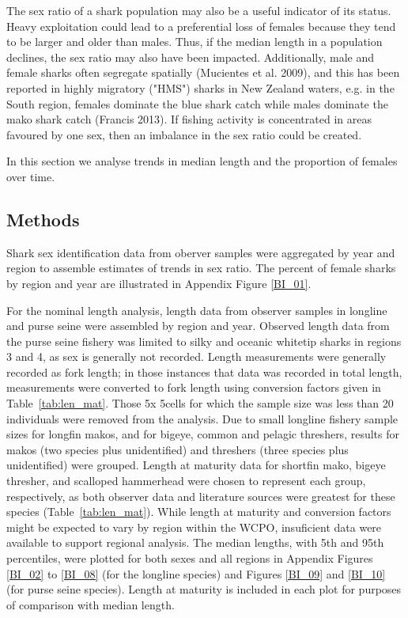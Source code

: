 \documentclass[12pt]{SCreport}
\begin{document}
The sex ratio of a shark population may also be a useful indicator of its status. Heavy exploitation could lead to a preferential loss of females because they tend to be larger and older than males. Thus, if the median length in a population declines, the sex ratio may also have been impacted. Additionally, male and female sharks often segregate spatially (Mucientes et al. 2009), and this has been reported in
highly migratory ("HMS") sharks in New Zealand waters, e.g. in the South region, females dominate the blue shark catch while males dominate the mako shark catch (Francis 2013). If fishing activity is concentrated in areas favoured by one sex, then an imbalance in the sex ratio could be created.

In this section we analyse trends in median length and the proportion of females over time.  
      

\subsection{Methods}\label{bi:methods}
Shark sex identification data from oberver samples were aggregated by year and region to assemble estimates of trends in sex ratio.  The percent of female sharks by region and year are illustrated in Appendix Figure \ref{BI_01}.
  
For the nominal length analysis, length data from observer samples in longline and purse seine were assembled by region and year.  Observed length data from the purse seine fishery was limited to silky and oceanic whitetip sharks in regions 3 and 4, as sex is generally not recorded.  Length measurements were generally recorded as fork length; in those instances that data was recorded in total length, measurements were converted to fork length using conversion factors given in Table~\ref{tab:len_mat}. Those 5\degree x 5\degree cells for which the sample size was less than 20 individuals were removed from the analysis.  Due to small longline fishery sample sizes for longfin makos, and for bigeye, common and pelagic threshers, results for makos (two species plus unidentified) and threshers (three species plus unidentified) were grouped. Length at maturity data for shortfin mako, bigeye thresher, and scalloped hammerhead were chosen to represent each group, respectively, as both observer data and literature sources were greatest for these species (Table~\ref{tab:len_mat}). While length at maturity and conversion factors might be expected to vary by region within the WCPO, insuficient data
were available to support regional analysis. The median lengths, with 5th and 95th percentiles, were plotted for both sexes and all regions in Appendix Figures \ref{BI_02} to \ref{BI_08} (for the longline species) and Figures \ref{BI_09} and \ref{BI_10} (for purse seine species).  Length at maturity is included in each plot for purposes of comparison with median length.
\end{document}
